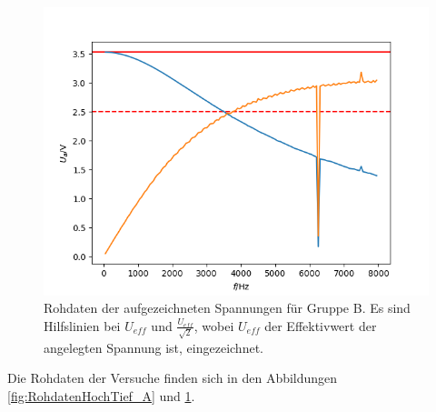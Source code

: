 \documentclass[12pt,a4paper]{article}
\begin{document}
\begin{figure}
\centering
\includegraphics[scale=1.0]{Bilder/RohdatenHochTief_B.png}
\caption{Rohdaten der aufgezeichneten Spannungen für Gruppe B. Es sind Hilfslinien bei $U_{eff}$ und $\frac{U_{eff}}{\sqrt{2}}$, wobei $U_{eff}$ der Effektivwert der angelegten Spannung ist, eingezeichnet.}
\label{fig:RohdatenHochTief_B}
\end{figure}

Die Rohdaten der Versuche finden sich in den Abbildungen \ref{fig:RohdatenHochTief_A} und \ref{fig:RohdatenHochTief_B}.
\end{document}
